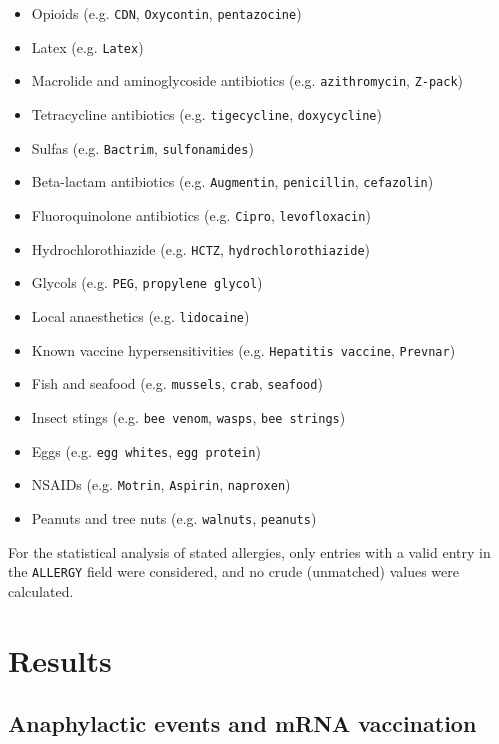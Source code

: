 \documentclass{article}
\begin{document}
\begin{itemize}
    \item Opioids (e.g. \texttt{CDN}, \texttt{Oxycontin}, \texttt{pentazocine})
    \item Latex (e.g. \texttt{Latex})
    \item Macrolide and aminoglycoside antibiotics (e.g. \texttt{azithromycin}, \texttt{Z-pack})
    \item Tetracycline antibiotics (e.g. \texttt{tigecycline}, \texttt{doxycycline})
    \item Sulfas (e.g. \texttt{Bactrim}, \texttt{sulfonamides})
    \item Beta-lactam antibiotics (e.g. \texttt{Augmentin}, \texttt{penicillin}, \texttt{cefazolin})
    \item Fluoroquinolone antibiotics (e.g. \texttt{Cipro}, \texttt{levofloxacin})
    \item Hydrochlorothiazide (e.g. \texttt{HCTZ}, \texttt{hydrochlorothiazide})
    \item Glycols (e.g. \texttt{PEG}, \texttt{propylene glycol})
    \item Local anaesthetics (e.g. \texttt{lidocaine})
    \item Known vaccine hypersensitivities (e.g. \texttt{Hepatitis vaccine}, \texttt{Prevnar})
    \item Fish and seafood (e.g. \texttt{mussels}, \texttt{crab}, \texttt{seafood})
    \item Insect stings (e.g. \texttt{bee venom}, \texttt{wasps}, \texttt{bee strings})
    \item Eggs (e.g. \texttt{egg whites}, \texttt{egg protein})
    \item NSAIDs (e.g. \texttt{Motrin}, \texttt{Aspirin}, \texttt{naproxen})
    \item Peanuts and tree nuts (e.g. \texttt{walnuts}, \texttt{peanuts})
\end{itemize}

For the statistical analysis of stated allergies, only entries with a valid entry in the \texttt{ALLERGY} field were considered, and no crude (unmatched) values were calculated.

\section{Results}

\subsection{Anaphylactic events and mRNA vaccination}
\end{document}
